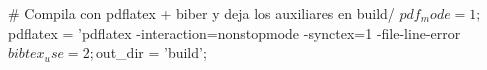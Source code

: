 # Compila con pdflatex + biber y deja los auxiliares en build/
$pdf_mode = 1;
$pdflatex = 'pdflatex -interaction=nonstopmode -synctex=1 -file-line-error %
$bibtex_use = 2;
$out_dir = 'build';
